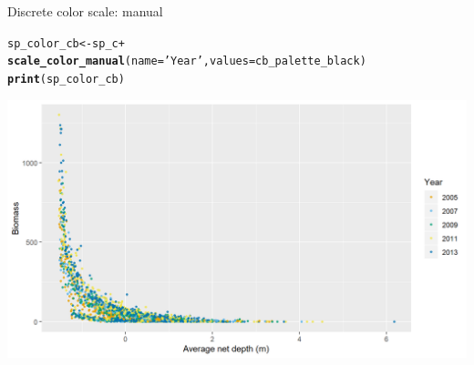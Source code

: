 \documentclass{beamer}\usepackage[]{graphicx}\usepackage[]{color}
\makeatletter
\newcommand{\hlstr}[1]{\textcolor[rgb]{0.192,0.494,0.8}{#1}}%
\newcommand{\hlopt}[1]{\textcolor[rgb]{0,0,0}{#1}}%
\newcommand{\hlstd}[1]{\textcolor[rgb]{0.345,0.345,0.345}{#1}}%
\newcommand{\hlkwb}[1]{\textcolor[rgb]{0.69,0.353,0.396}{#1}}%
\newcommand{\hlkwc}[1]{\textcolor[rgb]{0.333,0.667,0.333}{#1}}%
\newcommand{\hlkwd}[1]{\textcolor[rgb]{0.737,0.353,0.396}{\textbf{#1}}}%
\newenvironment{kframe}{%
 \def\at@end@of@kframe{}%
 \ifinner\ifhmode%
  \def\at@end@of@kframe{\end{minipage}}%
  \begin{minipage}{\columnwidth}%
 \fi\fi%
 \def\FrameCommand##1{\hskip\@totalleftmargin \hskip-\fboxsep
 \colorbox{shadecolor}{##1}\hskip-\fboxsep
     \hskip-\linewidth \hskip-\@totalleftmargin \hskip\columnwidth}%
 \MakeFramed {\advance\hsize-\width
   \@totalleftmargin\z@ \linewidth\hsize
   \@setminipage}}%
 {\par\unskip\endMakeFramed%
 \at@end@of@kframe}
\newenvironment{knitrout}{}{} %
\makeatother
\begin{document}
\begin{frame}[fragile]{Discrete color scale: manual}
\begin{knitrout}\footnotesize
{}\color{fgcolor}\begin{kframe}
\begin{alltt}
\hlstd{sp_color_cb} \hlkwb{<-} \hlstd{sp_c} \hlopt{+}
  \hlkwd{scale_color_manual}\hlstd{(}\hlkwc{name}\hlstd{=}\hlstr{'Year'}\hlstd{,} \hlkwc{values} \hlstd{= cb_palette_black)}
\hlkwd{print}\hlstd{(sp_color_cb)}
\end{alltt}
\end{kframe}

{\centering \includegraphics[width=.9\linewidth]{figure/sp_discrete_colorcb-1} 

}



\end{knitrout}
\end{frame}
\end{document}
